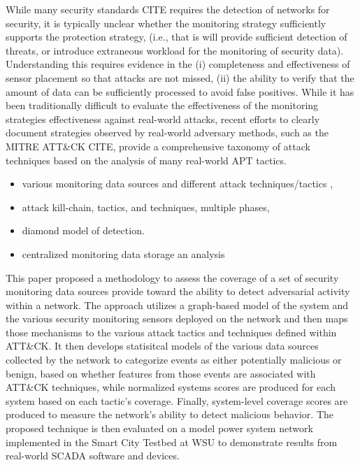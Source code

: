 \documentclass[journal]{IEEEtran}
\begin{document}
While many security  standards \color{red} CITE \color{black} requires the detection of networks for security, it is typically unclear whether the monitoring strategy sufficiently supports the protection strategy, (i.e., that is will provide sufficient detection of threats, or introduce extraneous workload for the monitoring of security data). Understanding this requires evidence in the (i) completeness and effectiveness of sensor placement so that attacks are not missed, (ii) the ability to verify that the amount of data can be sufficiently processed to avoid false positives. While it has been traditionally difficult to evaluate the effectiveness of the monitoring strategies effectiveness against real-world attacks, recent efforts to clearly document  strategies observed by real-world adversary methods, such as the MITRE ATT\&CK \color{red} CITE\color{black}, provide a comprehensive taxonomy of attack techniques based on the analysis of many real-world APT tactics.

\color{red}

\begin{itemize} 
	\item various monitoring data sources and different attack techniques/tactics ,
	\item attack kill-chain, tactics, and techniques, multiple phases,
	\item diamond model of detection.
    \item centralized monitoring data storage an analysis
\end{itemize}

\color{black}




This paper proposed a methodology to assess the coverage of a set of security monitoring data sources provide toward the ability to detect adversarial activity within a network. The approach utilizes a graph-based model of the system and the various security monitoring sensors deployed on the network and then maps those mechanisms to the various attack tactics and techniques defined within ATT\&CK. It then develops statisitcal models of the various data sources collected by the network to categorize events as either potentially malicious or benign, based on whether features from those events are associated with ATT\&CK techniques, while normalized systems scores are produced for each system based on each tactic's coverage. Finally, system-level coverage scores are produced to measure the network's ability to detect malicious behavior. The proposed technique is then evaluated on a model power system network implemented in the Smart City Testbed at WSU to demonstrate results from real-world SCADA software and devices.  
\end{document}
